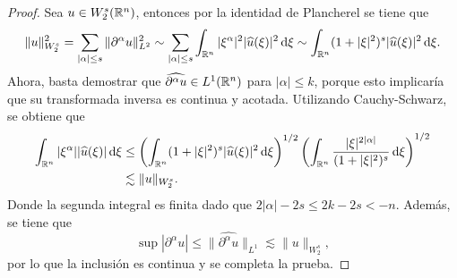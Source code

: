 \begin{proof}
	Sea $u\in W^s_2(\mathbb{R}^n)$, entonces por la identidad de Plancherel se tiene que 
	\begin{equation*}
		\|u\|_{W^s_2}^2 = \sum_{|\alpha|\leq s} \|\partial^\alpha u\|_{L^2}^2  \sim  \sum_{|\alpha|\leq s} \int_{\mathbb{R}^n} |\xi^\alpha|^2|\widehat{u}(\xi)|^2 \mathop{}\!\mathrm{d} \xi \sim  \int_{\mathbb{R}^n} (1+|\xi|^2)^s |\widehat{u}(\xi)|^2 \mathop{}\!\mathrm{d} \xi.
	\end{equation*}
	Ahora, basta demostrar que $\widehat{\partial^\alpha u} \in L^1(\mathbb{R}^n)$ para $|\alpha|\leq k$, porque esto implicaría que su transformada inversa es continua y acotada. Utilizando Cauchy-Schwarz, se obtiene que 
	\begin{align*}
		 \int_{\mathbb{R}^n} |\xi^\alpha||\widehat{u}(\xi)| \mathop{}\!\mathrm{d} \xi & \leq 
		 \left( \int_{\mathbb{R}^n} (1+|\xi|^2)^s |\widehat{u}(\xi)|^2 \mathop{}\!\mathrm{d} \xi \right)^{1/2}
		 \left( \int_{\mathbb{R}^n} \frac{|\xi|^{2|\alpha|}}{(1+|\xi|^2)^s}  \mathop{}\!\mathrm{d} \xi \right)^{1/2} \\
		 & \lesssim \|u\|_{W^s_2}.
	\end{align*}
	Donde la segunda integral es finita dado que $2|\alpha| - 2s \leq 2k -2s < -n$. Además, se tiene que 
	\begin{equation*}
		\sup|\partial^\alpha u| \leq \|\widehat{\partial^\alpha u} \|_{L^1} \lesssim  \|u\|_{W^s_2},
	\end{equation*}
	por lo que la inclusión es continua y se completa la prueba.
\end{proof}
